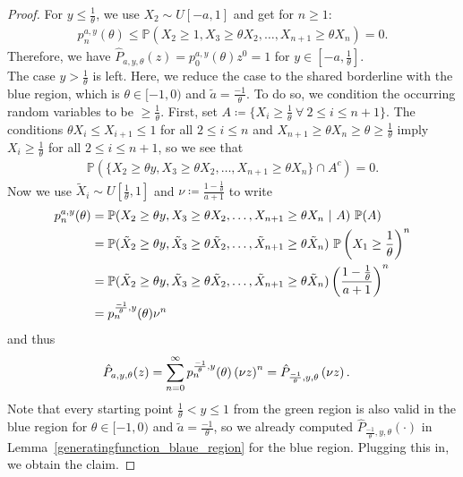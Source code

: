\documentclass[12pt]{article}
\renewcommand{\P}{\mathbb{P}} %
\newcommand{\1}{\mathds{1}}
\theoremstyle{definition}
\theoremstyle{plain}
\theoremstyle{remark}
\begin{document}
    \begin{proof}
    For $y\le\frac{1}{\theta}$, we use $X_2\sim U[-a,1]$ and get for $n\geq 1$:
     \begin{align*}
        p_n^{a,y}(\theta)\leq\P(X_2\ge1 ,X_3\geq\theta X_2,\dots,X_{n+1}\geq\theta X_n)=0.
    \end{align*}
    Therefore, we have $\hat{P}_{a,y,\theta}(z)=p_0^{a,y}(\theta)z^0=1$ for $y\in\left[-a,\frac{1}{\theta}\right]$.
    \\The case $y>\frac{1}{\theta}$ is left. Here, we reduce the case to the shared borderline with the blue region, which is $\theta\in[-1,0)$ and $\tilde a=\frac{-1}{\theta}$. To do so, we condition the occurring random variables to be $\geq\frac{1}{\theta}$.
    First, set $A\coloneqq \{X_i\geq\frac{1}{\theta}~\forall~2\leq i\leq n+1\}$. The conditions $\theta X_i\leq X_{i+1}\leq 1$ for all $2\leq i\leq n$ and $X_{n+1}\geq\theta X_n\geq \theta\geq\frac{1}{\theta}$ imply $X_i\geq\frac{1}{\theta}$ for all $2\leq i \leq n+1$, so we see that
    \begin{align*}
        \P(\{X_2\geq\theta y,X_3\geq\theta X_2,\dots,X_{n+1}\geq\theta X_n\}\cap A^c)=0.
    \end{align*}
    Now we use $\tilde{X}_i \sim U\left[\frac{1}{\theta},1\right]$ and $\nu\coloneqq\frac{1-\frac{1}{\theta}}{a+1}$ to write
    \begin{align}\label{reduction_green_blue_prob}
        p_n^{a,y}(\theta)&=\P(X_2\geq\theta y,X_3\geq\theta X_2,\dots,X_{n+1}\geq\theta X_n~|~A)\ \P(A)\notag
        \\&=\P(\tilde{X}_2\geq\theta y,\tilde{X}_3\geq\theta \tilde{X}_2,\dots,\tilde{X}_{n+1}\geq\theta \tilde{X}_n)\ \P\left(X_1\geq\frac{1}{\theta}\right)^n\notag
        \\&=\P(\tilde{X}_2\geq\theta y,\tilde{X}_3\geq\theta \tilde{X}_2,\dots,\tilde{X}_{n+1}\geq\theta \tilde{X}_n)\left(\frac{1-\frac{1}{\theta}}{a+1}\right)^n\notag
        \\&= p_n^{\frac{-1}{\theta},y}(\theta)\nu^n
    \end{align}
    and thus
    \begin{align*}%
     \hat{P}_{a,y,\theta}(z)&\notag
     = \sum_{n=0}^{\infty}p_n^{\frac{-1}{\theta},y}(\theta)\left(\nu z\right)^n
     =\hat{P}_{\frac{-1}{\theta},y,\theta}\left(\nu z\right).
    \end{align*}
    Note that every starting point $\frac{1}{\theta}< y\leq 1$ from the green region is also valid in the blue region for $\theta\in[-1,0)$ and $\tilde a=\frac{-1}{\theta}$, so we already computed $\hat{P}_{\frac{-1}{\theta},y,\theta}(\cdot)$ in Lemma~\ref{generatingfunction_blaue_region} for the blue region. Plugging this in, we obtain the claim.
    \end{proof}
\end{document}
